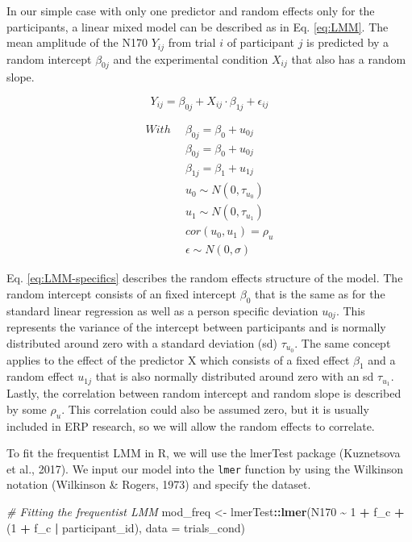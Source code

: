 \documentclass[
  doc,12pt,floatsintext]{apa7}
\newenvironment{Shaded}{\begin{snugshade}}{\end{snugshade}}
\newcommand{\AttributeTok}[1]{\textcolor[rgb]{0.13,0.29,0.53}{#1}}
\newcommand{\CommentTok}[1]{\textcolor[rgb]{0.56,0.35,0.01}{\textit{#1}}}
\newcommand{\DecValTok}[1]{\textcolor[rgb]{0.00,0.00,0.81}{#1}}
\newcommand{\FunctionTok}[1]{\textcolor[rgb]{0.13,0.29,0.53}{\textbf{#1}}}
\newcommand{\NormalTok}[1]{#1}
\newcommand{\OtherTok}[1]{\textcolor[rgb]{0.56,0.35,0.01}{#1}}
\newcommand{\SpecialCharTok}[1]{\textcolor[rgb]{0.81,0.36,0.00}{\textbf{#1}}}
\begin{document}
In our simple case with only one predictor and random effects only for the participants, a linear mixed model can be described as in Eq. \eqref{eq:LMM}. The mean amplitude of the N170 \(Y_{ij}\) from trial \(i\) of participant \(j\) is predicted by a random intercept \(\beta_{0j}\) and the experimental condition \(X_{ij}\) that also has a random slope.

\begin{equation} 
Y_{ij} = \beta_{0j} + X_{ij} \cdot \beta_{1j} + \epsilon_{ij}
\label{eq:LMM}
\end{equation}

\begin{equation} 
\begin{split}
With \enspace & \beta_{0j} = \beta_{0} + u_{0j} \\
& \beta_{0j} = \beta_{0} + u_{0j} \\
& \beta_{1j} = \beta_{1} + u_{1j} \\
& u_0 \sim N(0, \tau_{u_0}) \\
& u_1 \sim N(0, \tau_{u_1}) \\
& cor(u_0, u_1) = \rho_u \\
& \epsilon \sim N(0, \sigma)
\end{split}
\label{eq:LMM-specifics}
\end{equation}

Eq. \eqref{eq:LMM-specifics} describes the random effects structure of the model. The random intercept consists of an fixed intercept \(\beta_{0}\) that is the same as for the standard linear regression as well as a person specific deviation \(u_{0j}\). This represents the variance of the intercept between participants and is normally distributed around zero with a standard deviation (sd) \(\tau_{u_0}\). The same concept applies to the effect of the predictor X which consists of a fixed effect \(\beta_{1}\) and a random effect \(u_{1j}\) that is also normally distributed around zero with an sd \(\tau_{u_1}\). Lastly, the correlation between random intercept and random slope is described by some \(\rho_u\). This correlation could also be assumed zero, but it is usually included in ERP research, so we will allow the random effects to correlate.

To fit the frequentist LMM in R, we will use the lmerTest package (Kuznetsova et al., 2017). We input our model into the \texttt{lmer} function by using the Wilkinson notation (Wilkinson \& Rogers, 1973) and specify the dataset.

\begin{Shaded}
\begin{Highlighting}[]
\CommentTok{\# Fitting the frequentist LMM}
\NormalTok{mod\_freq }\OtherTok{\textless{}{-}}\NormalTok{ lmerTest}\SpecialCharTok{::}\FunctionTok{lmer}\NormalTok{(N170 }\SpecialCharTok{\textasciitilde{}} \DecValTok{1} \SpecialCharTok{+}\NormalTok{ f\_c }\SpecialCharTok{+}\NormalTok{ (}\DecValTok{1} \SpecialCharTok{+}\NormalTok{ f\_c }\SpecialCharTok{|}\NormalTok{ participant\_id), }
                           \AttributeTok{data =}\NormalTok{ trials\_cond)}
\end{Highlighting}
\end{Shaded}
\end{document}
